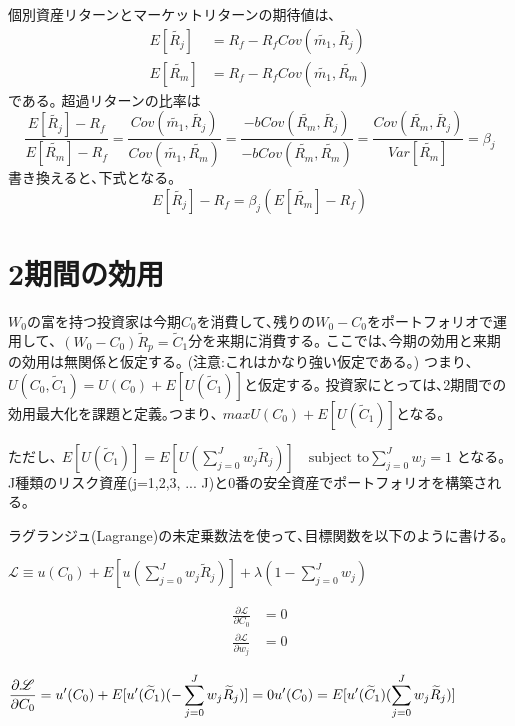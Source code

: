 \documentclass[uplatex,a4paper]{jsarticle}
\begin{document}
個別資産リターンとマーケットリターンの期待値は､
\begin{align*}
E [ \widetilde{R_j}]
& = R_f - R_f Cov(\widetilde{m_1}, \widetilde{R_j}) \\
E [ \widetilde{R_m}]
& = R_f - R_f Cov(\widetilde{m_1}, \widetilde{R_m})
\end{align*}
である｡
超過リターンの比率は
\begin{equation*}
\frac{E [ \widetilde{R_j}] - R_f }{E [ \widetilde{R_m}] - R_f}
= \frac{Cov(\widetilde{m_1}, \widetilde{R_j})}{Cov(\widetilde{m_1}, \widetilde{R_m}) }
= \frac{-b Cov(\widetilde{R_m}, \widetilde{R_j})}{-b Cov(\widetilde{R_m}, \widetilde{R_m}) }
= \frac{Cov(\widetilde{R_m}, \widetilde{R_j})}{Var[\widetilde{R_m}]}
= \beta_j
\end{equation*}
書き換えると､下式となる｡
\begin{equation*}
E [ \widetilde{R_j}] - R_f = \beta_j (E [ \widetilde{R_m}] - R_f)
\end{equation*}


\section{2期間の効用}
$W_0$の富を持つ投資家は今期$C_0$を消費して､残りの$W_0 - C_0$をポートフォリオで運用して､
$(W_0 - C_0) \widetilde R_p = \widetilde C_1$分を来期に消費する｡
ここでは､今期の効用と来期の効用は無関係と仮定する｡
(注意:これはかなり強い仮定である｡)
つまり､
$U(C_0, \widetilde C_1) = U(C_0) + E[U(\widetilde C_1)]$と仮定する｡
投資家にとっては､2期間での効用最大化を課題と定義｡つまり､
$ max U(C_0) + E[U(\widetilde C_1)]$となる｡

ただし､
$E[U(\widetilde C_1)] = E[U(\sum_{j=0}^{J} w_j \widetilde R_j)]  \quad
\text{subject to}  \sum_{j=0}^{J} w_j = 1$ となる｡
J種類のリスク資産(j=1,2,3, ... J)と0番の安全資産でポートフォリオを構築される｡


ラグランジュ(Lagrange)の未定乗数法を使って､目標関数を以下のように書ける｡

$
\displaystyle
\mathscr{L} \equiv u(C_0) + E[u(\sum_{j=0}^{J} w_j \widetilde R_j)] + \lambda ( 1 - \sum_{j=0}^{J} w_j )
$


\begin{align*}
    \frac{\partial \mathscr{L} }{\partial C_0} & =  0 \\
    \frac{\partial \mathscr{L} }{\partial w_j} & =  0
\end{align*}


$
\displaystyle
\frac{\partial \mathscr{L} }{\partial C_0}  =
u'(C_0) + E[u'(\widetilde C_1)(-\sum_{j=0}^{J} w_j \widetilde R_j)]
= 0 \\
u'(C_0) = E[u'(\widetilde C_1)(\sum_{j=0}^{J} w_j \widetilde R_j)]
$
\end{document}
